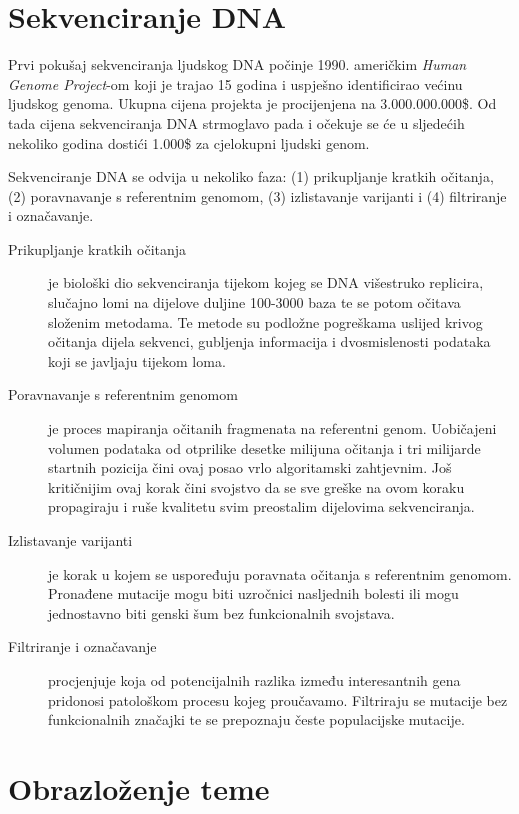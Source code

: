 \documentclass[times, utf8, diplomski]{fer}
\begin{document}
\section{Sekvenciranje DNA}

Prvi pokušaj sekvenciranja ljudskog DNA počinje 1990. američkim \emph{Human Genome Project}-om koji je trajao 15
godina i uspješno identificirao većinu ljudskog genoma. Ukupna cijena projekta je procijenjena na 3.000.000.000\$.
\cite{genomefaq}
Od tada cijena sekvenciranja DNA strmoglavo pada i očekuje se će u sljedećih nekoliko godina dostići 1.000\$ za
cjelokupni ljudski genom.

Sekvenciranje DNA se odvija u nekoliko faza: (1) prikupljanje kratkih očitanja, (2) poravnavanje s referentnim genomom, (3) izlistavanje varijanti i (4) filtriranje i označavanje. \cite{mardis2008next}

\begin{description}
\item[Prikupljanje kratkih očitanja] je biološki dio sekvenciranja tijekom kojeg se DNA višestruko replicira, slučajno lomi na dijelove duljine 100-3000 baza te se potom očitava složenim metodama. Te metode su podložne pogreškama uslijed krivog očitanja dijela sekvenci, gubljenja informacija i dvosmislenosti podataka koji se javljaju tijekom loma.

\item[Poravnavanje s referentnim genomom] je proces mapiranja očitanih fragmenata na referentni genom. Uobičajeni volumen podataka od otprilike desetke milijuna očitanja i tri milijarde startnih pozicija čini ovaj posao vrlo
algoritamski zahtjevnim. Još kritičnijim ovaj korak čini svojstvo da se sve greške na ovom koraku propagiraju i
ruše kvalitetu svim preostalim dijelovima sekvenciranja.

\item [Izlistavanje varijanti] je korak u kojem se uspoređuju poravnata očitanja s referentnim genomom. Pronađene
mutacije mogu biti uzročnici nasljednih bolesti ili mogu jednostavno biti genski šum bez funkcionalnih svojstava.

\item [Filtriranje i označavanje] procjenjuje koja od potencijalnih razlika između interesantnih gena pridonosi 
patološkom procesu kojeg proučavamo. Filtriraju se mutacije bez funkcionalnih značajki te se prepoznaju česte populacijske mutacije.
\end{description}

\section{Obrazloženje teme}
\end{document}
